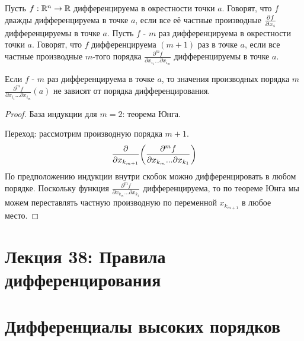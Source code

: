     \begin{definition}
    	Пусть $f : \mathbb R^n \rightarrow \mathbb R$ дифференцируема в окрестности точки $a$. Говорят, что $f$ дважды дифференцируема в точке $a$, если все её частные производные $\pdv{f}{x_i}$ дифференцируемы в точке $a$. Пусть $f$ - $m$ раз дифференцируема в окрестности точки $a$. Говорят, что $f$ дифференцируема $(m + 1)$ раз в точке $a$, если все частные производные $m$-того порядка $\frac{\partial^m f}{\partial x_{i_1} ... \partial x_{i_m}}$ дифференцируемы в точке $a$.
    \end{definition}
    
    \begin{corollary}
    	Если $f$ - $m$ раз дифференцируема в точке $a$, то значения производных порядка $m$  $\frac{\partial^m f}{\partial x_{i_1} ... \partial x_{i_m}}(a)$ не зависят от порядка дифференцирования.
    \end{corollary}
    
    \begin{proof}
    	База индукции для $m = 2$: теорема Юнга.
    	
    	Переход: рассмотрим производную порядка $m + 1$.
    	\[ \frac{\partial }{\partial x_{k_{m + 1}}} \bigg(\frac{\partial^m f}{\partial x_{k_m} ... \partial x_{k_1}}\bigg) \]
    	По предположению индукции внутри скобок можно дифференцировать в любом порядке. Поскольку функция $\frac{\partial^m f}{\partial x_{k_m} ... \partial x_{k_1}}$ дифференцируема, то по теореме Юнга мы можем переставлять частную производную по переменной $x_{k_{m + 1}}$ в любое место.
    \end{proof}
    
    \newpage
    
    \section*{Лекция 38: Правила дифференцирования}
    
    \section{Дифференциалы высоких порядков}
    
